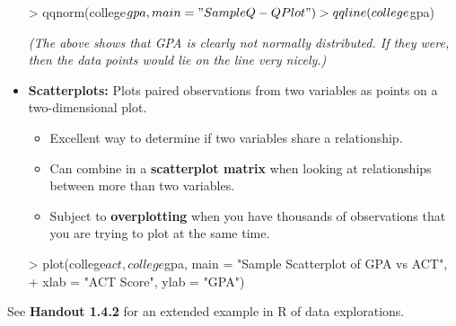 \documentclass[12pt]{../notes}
\begin{document}
\begin{itemize}
\begin{Schunk}
\begin{Sinput}
> qqnorm(college$gpa, main = "Sample Q-Q Plot")
> qqline(college$gpa)
\end{Sinput}
\end{Schunk}

\textit{(The above shows that GPA is clearly not normally distributed. If they were, then the data points would lie on the line very nicely.)}

\item \textbf{Scatterplots:} Plots paired observations from two variables as points on a two-dimensional plot.
\begin{itemize}
\item Excellent way to determine if two variables share a relationship.
\item Can combine in a \textbf{scatterplot matrix} when looking at relationships between more than two variables.
\item Subject to \textbf{overplotting} when you have thousands of observations that you are trying to plot at the same time.
\end{itemize}

\begin{Schunk}
\begin{Sinput}
> plot(college$act, college$gpa, main = "Sample Scatterplot of GPA vs ACT",
+      xlab = "ACT Score", ylab = "GPA")
\end{Sinput}
\end{Schunk}


\end{itemize} %

\nspace
See \textbf{Handout 1.4.2} for an extended example in R of data explorations.

















\end{document}

